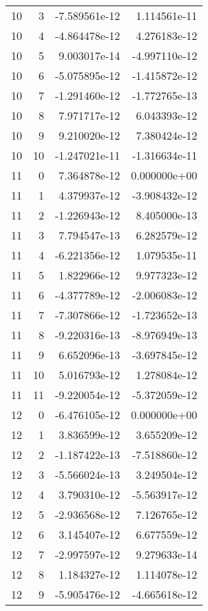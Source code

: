 \begin{tabular}{rrrr}
  10 &    3 & -7.589561e-12 &  1.114561e-11 \\
  10 &    4 & -4.864478e-12 &  4.276183e-12 \\
  10 &    5 &  9.003017e-14 & -4.997110e-12 \\
  10 &    6 & -5.075895e-12 & -1.415872e-12 \\
  10 &    7 & -1.291460e-12 & -1.772765e-13 \\
  10 &    8 &  7.971717e-12 &  6.043393e-12 \\
  10 &    9 &  9.210020e-12 &  7.380424e-12 \\
  10 &   10 & -1.247021e-11 & -1.316634e-11 \\
  11 &    0 &  7.364878e-12 &  0.000000e+00 \\
  11 &    1 &  4.379937e-12 & -3.908432e-12 \\
  11 &    2 & -1.226943e-12 &  8.405000e-13 \\
  11 &    3 &  7.794547e-13 &  6.282579e-12 \\
  11 &    4 & -6.221356e-12 &  1.079535e-11 \\
  11 &    5 &  1.822966e-12 &  9.977323e-12 \\
  11 &    6 & -4.377789e-12 & -2.006083e-12 \\
  11 &    7 & -7.307866e-12 & -1.723652e-13 \\
  11 &    8 & -9.220316e-13 & -8.976949e-13 \\
  11 &    9 &  6.652096e-13 & -3.697845e-12 \\
  11 &   10 &  5.016793e-12 &  1.278084e-12 \\
  11 &   11 & -9.220054e-12 & -5.372059e-12 \\
  12 &    0 & -6.476105e-12 &  0.000000e+00 \\
  12 &    1 &  3.836599e-12 &  3.655209e-12 \\
  12 &    2 & -1.187422e-13 & -7.518860e-12 \\
  12 &    3 & -5.566024e-13 &  3.249504e-12 \\
  12 &    4 &  3.790310e-12 & -5.563917e-12 \\
  12 &    5 & -2.936568e-12 &  7.126765e-12 \\
  12 &    6 &  3.145407e-12 &  6.677559e-12 \\
  12 &    7 & -2.997597e-12 &  9.279633e-14 \\
  12 &    8 &  1.184327e-12 &  1.114078e-12 \\
  12 &    9 & -5.905476e-12 & -4.665618e-12 \\

\end{tabular}
